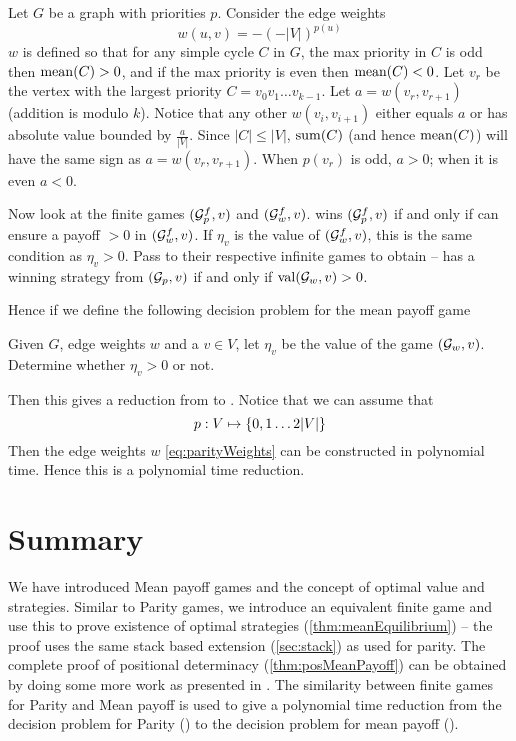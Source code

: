 Let $G$ be a graph with priorities $p$. Consider the edge weights
\begin{equation}
    \label{eq:parityWeights}
    w(u,v) = -(-|V|)^{p(u)}
\end{equation}
$w$ is defined so that for any simple cycle $C$ in $G$, the max priority in $C$ is odd then $\operatorname*{mean}(C)>0$, and if the max priority is even then $\operatorname*{mean}(C)<0$. Let $v_r$ be the vertex with the largest priority $C=v_0v_1 \ldots v_{k-1}$. Let $a=w(v_r,v_{r+1})$ (addition is modulo $k$). Notice that any other $w(v_i,v_{i+1})$ either equals $a$ or has absolute value bounded by $\frac{a}{|V|}$. Since $|C| \leq |V|$, $\operatorname{sum}(C)$ (and hence $\operatorname*{mean}(C)$) will have the same sign as $a=w(v_r,v_{r+1})$. When $p(v_r)$ is odd, $a > 0$; when it is even $a < 0$.

Now look at the finite games $(\mathcal{G}^f_p,v)$ and $(\mathcal{G}^f_w,v)$.  wins $(\mathcal{G}^f_p,v)$ if and only if  can ensure a payoff $>0$ in $(\mathcal{G}^f_w,v)$. If $\eta_v$ is the value of $(\mathcal{G}^f_w, v)$, this is the same condition as $\eta_v > 0$. Pass to their respective infinite games to obtain --  has a winning strategy from $(\mathcal{G}_p,v)$ if and only if $\operatorname{val}(\mathcal{G}_w, v) > 0$.

Hence if we define the following decision problem for the mean payoff game
\begin{decision}[MP]
    \label{dec:meanpayoff}
Given $G$, edge weights $w$ and a $v \in V$, let $\eta_v$ be the value of the game $(\mathcal{G}_w,v)$. Determine whether $\eta_v > 0$ or not.
\end{decision}
Then this gives a reduction from  to . Notice that we can assume that
\[
    p : V \mapsto \left\{0,1 \ldots 2|V|\right\}
\]
Then the edge weights $w$ \eqref{eq:parityWeights} can be constructed in polynomial time. Hence this is a polynomial time reduction.

\section{Summary}

We have introduced Mean payoff games and the concept of optimal value and strategies. Similar to Parity games, we introduce an equivalent finite game and use this to prove existence of optimal strategies (\autoref{thm:meanEquilibrium}) -- the proof uses the same stack based extension (\autoref{sec:stack}) as used for parity. The complete proof of positional determinacy (\autoref{thm:posMeanPayoff}) can be obtained by doing some more work as presented in \cite{bjorklund_memoryless_2004}. The similarity between finite games for Parity and Mean payoff is used to give a polynomial time reduction from the decision problem for Parity () to the decision problem for mean payoff ().

